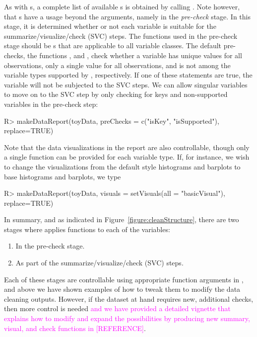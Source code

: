 \documentclass[article,shortnames]{jss}
\newcommand{\hl}[1]{\textcolor{magenta}{#1}}
\begin{document}
As with s, a complete list of available
s is obtained by calling
. Note however, that s have a
usage beyond the  arguments, namely in the
\textit{pre-check} stage. In this stage, it is determined whether or
not each variable is suitable for the summarize/visualize/check (SVC)
steps. The functions used in the pre-check stage should be
s that are applicable to all variable classes. The
default pre-checks, the functions ,  and , check
whether a variable has unique values for all observations, only a
single value for all observations, and is not among the variable types supported by , respectively. If one of these
statements are true, the variable will not be subjected to the SVC
steps.  We can allow singular variables to move on to the SVC step by
only checking for keys and non-supported variables in the pre-check step:

\begin{Schunk}
\begin{Sinput}
R> makeDataReport(toyData, preChecks = c("isKey", "isSupported"), replace=TRUE)
\end{Sinput}
\end{Schunk}

Note that the data visualizations in the report are also
controllable, though only a single function can be provided for each variable type. If, for instance, we wish to change the visualizations
from the default  \citep{ggplot2} style histograms and barplots to base
 histograms and barplots, we type

\begin{Schunk}
\begin{Sinput}
R> makeDataReport(toyData, visuals = setVisuals(all = "basicVisual"), replace=TRUE)
\end{Sinput}
\end{Schunk}

In summary, and as indicated in Figure~\ref{figure:cleanStructure}, there are two stages
where  applies functions to each of the variables:
\begin{enumerate}
\item In the pre-check stage.
\item As part of the summarize/visualize/check (SVC) steps.
\end{enumerate}
Each of these stages are controllable using appropriate function
arguments in , and above we have shown examples of how
to tweak them to modify the data cleaning outputs. However, if the
dataset at hand requires new, additional checks, then more control is
needed \hl{ and we have provided a detailed vignette that explains how to modify and
expand the possibilities by producing new summary, visual, and check
functions in [REFERENCE]}.
\end{document}
